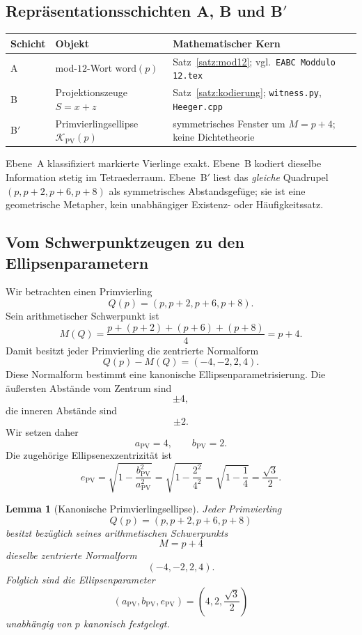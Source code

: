 \documentclass[11pt,a4paper]{article}
\theoremstyle{definition}
\theoremstyle{plain}
\newtheorem{lemma}[definition]{Lemma}
\begin{document}
	\subsection{Repräsentationsschichten A, B und B$'$}
	
	\begin{center}
		\begin{tabular}{@{}llp{6.8cm}@{}}
			\toprule
			Schicht & Objekt & Mathematischer Kern \\
			\midrule
			A & mod-$12$-Wort $\mathrm{word}(p)$ & Satz~\ref{satz:mod12}; vgl.\ \texttt{EABC Moddulo 12.tex} \\
			B & Projektionszeuge $S=x+z$ & Satz~\ref{satz:kodierung}; \texttt{witness.py}, \texttt{Heeger.cpp} \\
			B$'$ & Primvierlingsellipse $\mathcal{K}_{\mathrm{PV}}(p)$ & symmetrisches Fenster um $M=p+4$; keine Dichtetheorie \\
			\bottomrule
		\end{tabular}
	\end{center}
	
	Ebene~A klassifiziert markierte Vierlinge exakt. Ebene~B kodiert dieselbe Information stetig im Tetraederraum. Ebene~B$'$ liest das \emph{gleiche} Quadrupel $(p,p+2,p+6,p+8)$ als symmetrisches Abstandsgefüge; sie ist eine geometrische Metapher, kein unabhängiger Existenz- oder Häufigkeitssatz.
	
	\subsection{Vom Schwerpunktzeugen zu den Ellipsenparametern}
	
	Wir betrachten einen Primvierling
	\[
	Q(p)=(p,p+2,p+6,p+8).
	\]
	Sein arithmetischer Schwerpunkt ist
	\[
	M(Q)
	=\frac{p+(p+2)+(p+6)+(p+8)}{4}
	=p+4.
	\]
	Damit besitzt jeder Primvierling die zentrierte Normalform
	\[
	Q(p)-M(Q)
	=
	(-4,-2,2,4).
	\]
	Diese Normalform bestimmt eine kanonische Ellipsenparametrisierung. Die äußersten Abstände vom Zentrum sind
	\[
	\pm 4,
	\]
	die inneren Abstände sind
	\[
	\pm 2.
	\]
	Wir setzen daher
	\[
	a_{\mathrm{PV}}=4,
	\qquad
	b_{\mathrm{PV}}=2.
	\]
	Die zugehörige Ellipsenexzentrizität ist
	\[
	e_{\mathrm{PV}}
	=
	\sqrt{1-\frac{b_{\mathrm{PV}}^2}{a_{\mathrm{PV}}^2}}
	=
	\sqrt{1-\frac{2^2}{4^2}}
	=
	\sqrt{1-\frac14}
	=
	\frac{\sqrt3}{2}.
	\]
	
	\begin{lemma}[Kanonische Primvierlingsellipse]\label{lemma:kanonische-ellipse}
		Jeder Primvierling
		\[
		Q(p)=(p,p+2,p+6,p+8)
		\]
		besitzt bezüglich seines arithmetischen Schwerpunkts
		\[
		M=p+4
		\]
		dieselbe zentrierte Normalform
		\[
		(-4,-2,2,4).
		\]
		Folglich sind die Ellipsenparameter
		\[
		(a_{\mathrm{PV}},b_{\mathrm{PV}},e_{\mathrm{PV}})
		=
		\left(
		4,2,\frac{\sqrt3}{2}
		\right)
		\]
		unabhängig von $p$ kanonisch festgelegt.
	\end{lemma}
	
\end{document}
